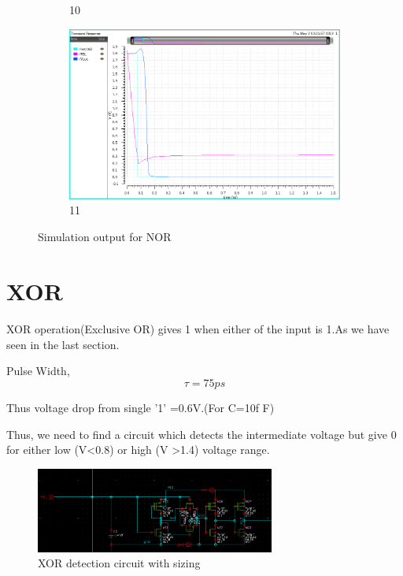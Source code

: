 \begin{figure}[H]
\begin{center}
\begin{subfigure}{0.4\textwidth}
\caption{10}
\end{subfigure}
\begin{subfigure}{0.4\textwidth}
\includegraphics[width=\textwidth]{nor11.png}
\caption{11}
\end{subfigure}
\end{center}
\caption{Simulation output for NOR }

\end{figure}


\section{XOR}
\paragraph{}

XOR operation(Exclusive OR) gives 1 when either of the input is 1.As we have seen in the last section.

Pulse Width,$$\tau = 75ps$$

Thus voltage drop from single '1' =0.6V.(For C=10f F)

Thus, we need to find a circuit which detects the intermediate voltage but give 0 for either low (V<0.8) or high (V >1.4) voltage range.

\begin{figure}[h]
    \centering
    \includegraphics[width=0.7\textwidth]{zor.png}
    \caption{XOR detection circuit with sizing}
    \label{fig:mesh1}
\end{figure}

